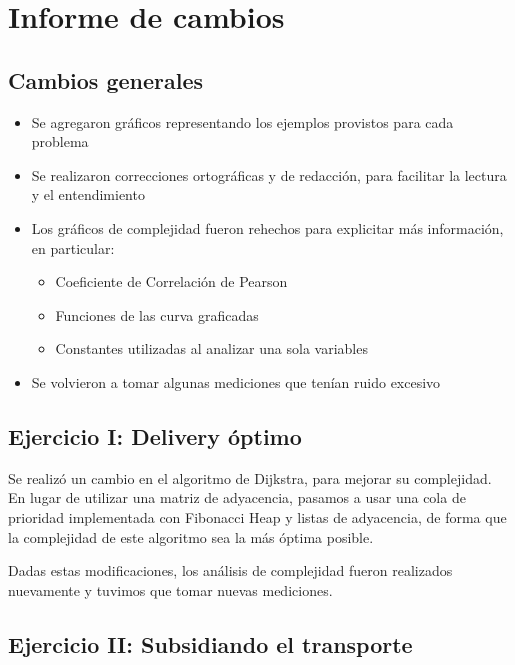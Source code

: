 \renewcommand\labelitemii{$\circ$}
\section{Informe de cambios}
	\subsection*{Cambios generales}

	\begin{itemize}
		\item Se agregaron gráficos representando los ejemplos provistos para cada problema
		
		\item Se realizaron correcciones ortográficas y de redacción, para facilitar la lectura y el entendimiento

		\item Los gráficos de complejidad fueron rehechos para explicitar más información, en particular:

		\begin{itemize}
			\item Coeficiente de Correlación de Pearson

			\item Funciones de las curva graficadas

			\item Constantes utilizadas al analizar una sola variables
		\end{itemize}

		\item Se volvieron a tomar algunas mediciones que tenían ruido excesivo
	\end{itemize}

	\subsection*{Ejercicio I: Delivery óptimo}

	Se realizó un cambio en el algoritmo de Dijkstra, para mejorar su complejidad. En lugar de utilizar una matriz de adyacencia, pasamos a usar una cola de prioridad implementada con Fibonacci Heap y listas de adyacencia, de forma que la complejidad de este algoritmo sea la más óptima posible.

	Dadas estas modificaciones, los análisis de complejidad fueron realizados nuevamente y tuvimos que tomar nuevas mediciones.

	\subsection*{Ejercicio II: Subsidiando el transporte}

